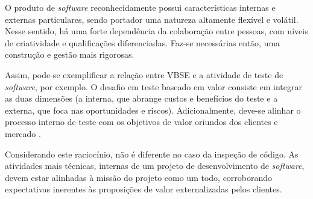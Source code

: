 O produto de \textit{software} reconhecidamente possui características internas e externas particulares, sendo portador uma natureza altamente flexível e volátil. Nesse sentido, há uma forte dependência da colaboração entre pessoas, com níveis de criatividade e qualificações diferenciadas. Faz-se necessárias então, uma construção e gestão mais rigorosas.

Assim, pode-se exemplificar a relação entre VBSE e a atividade de teste de \textit{software}, por exemplo. O desafio em teste baseado em valor consiste em integrar as duas dimensões (a interna, que abrange custos e benefícios do teste e a externa, que foca nas oportunidades e riscos). Adicionalmente, deve-se  alinhar o processo interno de teste com os objetivos de valor oriundos dos clientes e mercado \cite{vbse1}.

Considerando este raciocínio, não é diferente no caso da inspeção de código. As atividades mais técnicas, internas de um projeto de desenvolvimento de \textit{software}, devem estar alinhadas à missão do projeto como um todo, corroborando expectativas inerentes às proposições de valor externalizadas pelos clientes.